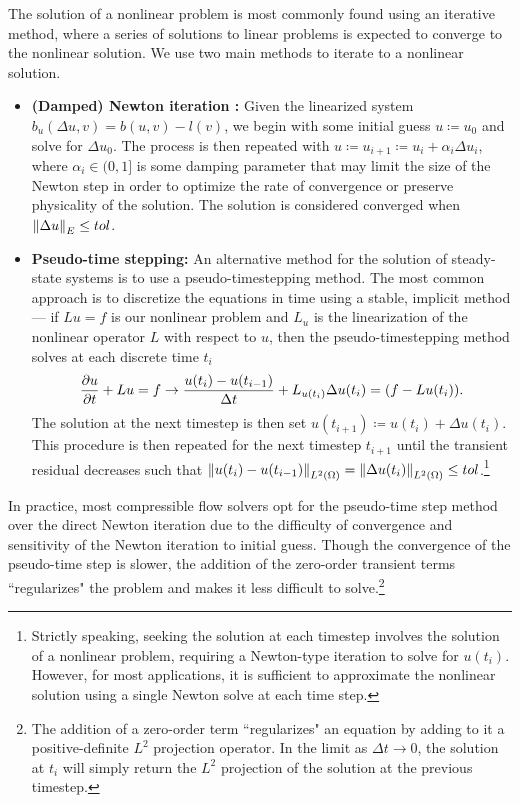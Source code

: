 The solution of a nonlinear problem is most commonly found using an iterative method, where a series of solutions to linear problems is expected to converge to the nonlinear solution.  We use two main methods to iterate to a nonlinear solution.  
\begin{itemize}
\item{} \textbf{(Damped) Newton iteration :} Given the linearized system $b_u(\Delta u,v) = b(u,v)-l(v)$, we begin with some initial guess $u\coloneqq u_0$ and solve for $\Delta u_0$.  The process is then repeated with $u\coloneqq u_{i+1} \coloneqq u_i + \alpha_i \Delta u_i$, where $\alpha_i \in (0,1]$ is some damping parameter that may limit the size of the Newton step in order to optimize the rate of convergence or preserve physicality of the solution.  The solution is considered converged when $\nor{\Delta u}_E \leq tol$.  
\item{} \textbf{Pseudo-time stepping: } An alternative method for the solution of steady-state systems is to use a pseudo-timestepping method.  The most common approach is to discretize the equations in time using a stable, implicit method --- if $Lu = f$ is our nonlinear problem and $L_u$ is the linearization of the nonlinear operator $L$ with respect to $u$, then the pseudo-timestepping method solves at each discrete time $t_{i}$
\[
\pd{u}{t} + Lu = f \rightarrow \frac{u(t_i) - u(t_{i-1})}{\Delta t} + L_{u(t_i)}\Delta u(t_i) = (f - Lu(t_i)).
\]
The solution at the next timestep is then set $u(t_{i+1}) \coloneqq u(t_i) + \Delta u(t_i)$.  This procedure is then repeated for the next timestep $t_{i+1}$ until the transient residual decreases such that $\nor{u(t_i) - u(t_{i-1})}_{L^2(\Omega)} = \nor{\Delta u(t_i)}_{L^2(\Omega)} \leq tol$.\footnote{Strictly speaking, seeking the solution at each timestep involves the solution of a nonlinear problem, requiring a Newton-type iteration to solve for $u(t_i)$.  However, for most applications, it is sufficient to approximate the nonlinear solution using a single Newton solve at each time step.} 
\end{itemize}

In practice, most compressible flow solvers opt for the pseudo-time step method over the direct Newton iteration due to the difficulty of convergence and sensitivity of the Newton iteration to initial guess\cite{libMeshPaper}.  Though the convergence of the pseudo-time step is slower, the addition of the zero-order transient terms ``regularizes" the problem and makes it less difficult to solve.\footnote{The addition of a zero-order term ``regularizes" an equation by adding to it a positive-definite $L^2$ projection operator.  In the limit as $\Delta t\rightarrow 0$, the solution at $t_i$ will simply return the $L^2$ projection of the solution at the previous timestep.}

